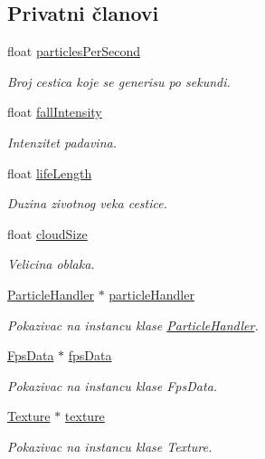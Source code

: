 \subsection*{Privatni članovi}
\begin{DoxyCompactItemize}
\item 
float \hyperlink{classparticle_1_1WeatherSystem_ad2bd921d15667d8866d64fa633d76d0f}{particles\+Per\+Second}
\begin{DoxyCompactList}\small\item\em Broj cestica koje se generisu po sekundi. \end{DoxyCompactList}\item 
float \hyperlink{classparticle_1_1WeatherSystem_aceaf5d329722c25c744bf3cbdc155295}{fall\+Intensity}
\begin{DoxyCompactList}\small\item\em Intenzitet padavina. \end{DoxyCompactList}\item 
float \hyperlink{classparticle_1_1WeatherSystem_a0aa06ba52db7729e12657baf726fb116}{life\+Length}
\begin{DoxyCompactList}\small\item\em Duzina zivotnog veka cestice. \end{DoxyCompactList}\item 
float \hyperlink{classparticle_1_1WeatherSystem_a64e9626cc1511271c24ff62a1c31200f}{cloud\+Size}
\begin{DoxyCompactList}\small\item\em Velicina oblaka. \end{DoxyCompactList}\item 
\hyperlink{classparticle_1_1ParticleHandler}{Particle\+Handler} $\ast$ \hyperlink{classparticle_1_1WeatherSystem_a0f24302815bf5a77140b26d015fefdbe}{particle\+Handler}
\begin{DoxyCompactList}\small\item\em Pokazivac na instancu klase \hyperlink{classparticle_1_1ParticleHandler}{Particle\+Handler}. \end{DoxyCompactList}\item 
\hyperlink{classutility_1_1FpsData}{Fps\+Data} $\ast$ \hyperlink{classparticle_1_1WeatherSystem_adefe5a2956dfd92f8271ed0e8c70799e}{fps\+Data}
\begin{DoxyCompactList}\small\item\em Pokazivac na instancu klase Fps\+Data. \end{DoxyCompactList}\item 
\hyperlink{classtexture_1_1Texture}{Texture} $\ast$ \hyperlink{classparticle_1_1WeatherSystem_a8fbccea8de57ff87bdd606aa6e95cbab}{texture}
\begin{DoxyCompactList}\small\item\em Pokazivac na instancu klase Texture. \end{DoxyCompactList}\end{DoxyCompactItemize}


